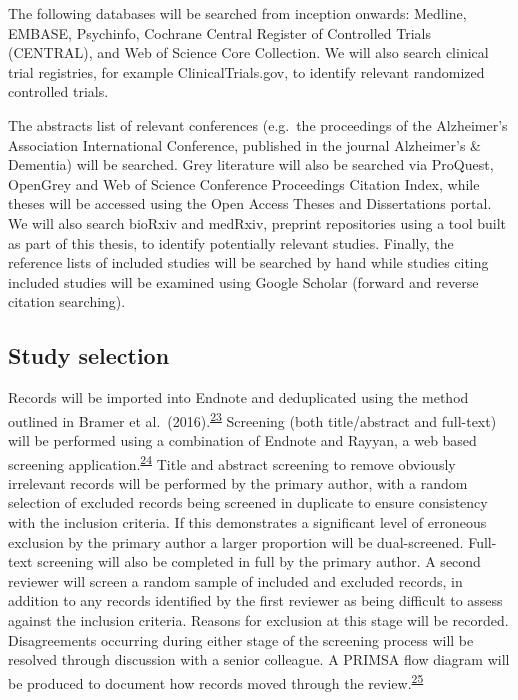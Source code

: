 \documentclass[a4paper, twoside]{templates/ociamthesis}
\begin{document}
The following databases will be searched from inception onwards: Medline, EMBASE, Psychinfo, Cochrane Central Register of Controlled Trials (CENTRAL), and Web of Science Core Collection. We will also search clinical trial registries, for example ClinicalTrials.gov, to identify relevant randomized controlled trials.

The abstracts list of relevant conferences (e.g.~the proceedings of the Alzheimer's Association International Conference, published in the journal Alzheimer's \& Dementia) will be searched. Grey literature will also be searched via ProQuest, OpenGrey and Web of Science Conference Proceedings Citation Index, while theses will be accessed using the Open Access Theses and Dissertations portal. We will also search bioRxiv and medRxiv, preprint repositories using a tool built as part of this thesis, to identify potentially relevant studies. Finally, the reference lists of included studies will be searched by hand while studies citing included studies will be examined using Google Scholar (forward and reverse citation searching).

\hypertarget{study-selection}{%
\subsection{Study selection}\label{study-selection}}

Records will be imported into Endnote and deduplicated using the method outlined in Bramer et al.~(2016).\textsuperscript{\protect\hyperlink{ref-bramer2016}{23}} Screening (both title/abstract and full-text) will be performed using a combination of Endnote and Rayyan, a web based screening application.\textsuperscript{\protect\hyperlink{ref-ouzzani2016}{24}}
Title and abstract screening to remove obviously irrelevant records will be performed by the primary author, with a random selection of excluded records being screened in duplicate to ensure consistency with the inclusion criteria. If this demonstrates a significant level of erroneous exclusion by the primary author a larger proportion will be dual-screened.
Full-text screening will also be completed in full by the primary author. A second reviewer will screen a random sample of included and excluded records, in addition to any records identified by the first reviewer as being difficult to assess against the inclusion criteria. Reasons for exclusion at this stage will be recorded. Disagreements occurring during either stage of the screening process will be resolved through discussion with a senior colleague. A PRIMSA flow diagram will be produced to document how records moved through the review.\textsuperscript{\protect\hyperlink{ref-zotero-766}{25}}
\end{document}
